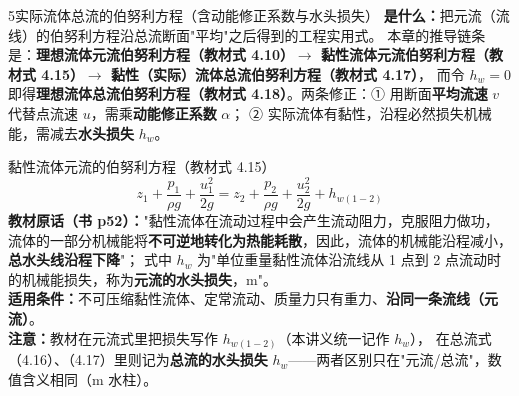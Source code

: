 \begin{kaodian}{5}{实际流体总流的伯努利方程（含动能修正系数与水头损失）}
\textbf{是什么：}把元流（流线）的伯努利方程沿总流断面"平均"之后得到的工程实用式。
本章的推导链条是：\textbf{理想流体元流伯努利方程（教材式 4.10）$\to$ 黏性流体元流伯努利方程（教材式 4.15）$\to$ 黏性（实际）流体总流伯努利方程（教材式 4.17）}，
而令 $h_w=0$ 即得\textbf{理想流体总流伯努利方程（教材式 4.18）}。两条修正：① 用断面\textbf{平均流速} $v$ 代替点流速 $u$，需乘\textbf{动能修正系数} $\alpha$；
② 实际流体有黏性，沿程必然损失机械能，需减去\textbf{水头损失} $h_w$。

\begin{gongshi}{黏性流体元流的伯努利方程（教材式 4.15）}
\[ z_1+\frac{p_1}{\rho g}+\frac{u_1^2}{2g}=z_2+\frac{p_2}{\rho g}+\frac{u_2^2}{2g}+h_{w(1-2)} \]
\textbf{教材原话（书 p52）：}"黏性流体在流动过程中会产生流动阻力，克服阻力做功，流体的一部分机械能将\textbf{不可逆地转化为热能耗散}，因此，流体的机械能沿程减小，\textbf{总水头线沿程下降}"；
式中 $h_w$ 为"单位重量黏性流体沿流线从 1 点到 2 点流动时的机械能损失，称为\textbf{元流的水头损失}，m"。\\
\textbf{适用条件：}不可压缩黏性流体、定常流动、质量力只有重力、\textbf{沿同一条流线（元流）}。\\
\textbf{注意：}教材在元流式里把损失写作 $h_{w(1-2)}$（本讲义统一记作 $h_w$），
在总流式（4.16）、（4.17）里则记为\textbf{总流的水头损失} $h_w$——两者区别只在"元流/总流"，数值含义相同（m 水柱）。
\end{gongshi}


\end{kaodian}
